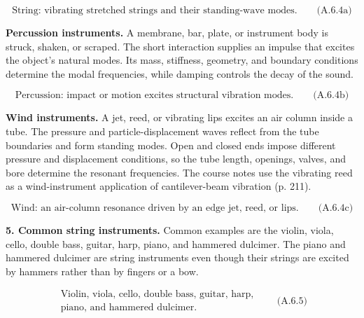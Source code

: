 \[
\boxed{\text{String: vibrating stretched strings and their standing-wave modes.}}\qquad\text{(A.6.4a)}
\]

\noindent\begin{minipage}{\linewidth}\color{black}
\textbf{Percussion instruments.} A membrane, bar, plate, or instrument body is struck, shaken, or scraped. The short interaction supplies an impulse that excites the object's natural modes. Its mass, stiffness, geometry, and boundary conditions determine the modal frequencies, while damping controls the decay of the sound.

\[
\boxed{\text{Percussion: impact or motion excites structural vibration modes.}}\qquad\text{(A.6.4b)}
\]
\end{minipage}\par

\textbf{Wind instruments.} A jet, reed, or vibrating lips excites an air column inside a tube. The pressure and particle-displacement waves reflect from the tube boundaries and form standing modes. Open and closed ends impose different pressure and displacement conditions, so the tube length, openings, valves, and bore determine the resonant frequencies. The course notes use the vibrating reed as a wind-instrument application of cantilever-beam vibration (p. 211).

\[
\boxed{\text{Wind: an air-column resonance driven by an edge jet, reed, or lips.}}\qquad\text{(A.6.4c)}
\]

\textbf{5. Common string instruments.} Common examples are the violin, viola, cello, double bass, guitar, harp, piano, and hammered dulcimer. The piano and hammered dulcimer are string instruments even though their strings are excited by hammers rather than by fingers or a bow.

\[
\boxed{\begin{gathered}
\text{Violin, viola, cello, double bass, guitar, harp,}\\
\text{piano, and hammered dulcimer.}
\end{gathered}}\qquad\text{(A.6.5)}
\]
